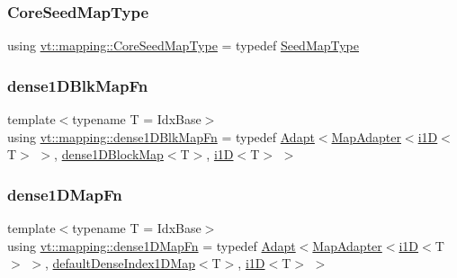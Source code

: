 \subsubsection{\texorpdfstring{Core\+Seed\+Map\+Type}{CoreSeedMapType}}
{\footnotesize\ttfamily using \hyperlink{namespacevt_1_1mapping_a963a37316992c8805e9a381a07380de0}{vt\+::mapping\+::\+Core\+Seed\+Map\+Type} = typedef \hyperlink{namespacevt_1_1mapping_a1c1409d9af8d1ac402af022a65be4a4d}{Seed\+Map\+Type}}

\mbox{\label{namespacevt_1_1mapping_aa1117076bb1d73ecb84905dc391c0528}} 
\subsubsection{\texorpdfstring{dense1\+D\+Blk\+Map\+Fn}{dense1DBlkMapFn}}
{\footnotesize\ttfamily template$<$typename T  = Idx\+Base$>$ \\
using \hyperlink{namespacevt_1_1mapping_aa1117076bb1d73ecb84905dc391c0528}{vt\+::mapping\+::dense1\+D\+Blk\+Map\+Fn} = typedef \hyperlink{namespacevt_1_1mapping_aafe187035ce8df02f31983e37cdb6a5d}{Adapt}$<$\hyperlink{namespacevt_1_1mapping_a41b113c28bb6430fbcb5be66e08ccf9f}{Map\+Adapter}$<$\hyperlink{namespacevt_1_1mapping_af0c14a9a77e0311b3d089143ed93ba76}{i1D}$<$T$>$ $>$, \hyperlink{namespacevt_1_1mapping_a2d49151f03d4ce393b01c620f6b18517}{dense1\+D\+Block\+Map}$<$T$>$, \hyperlink{namespacevt_1_1mapping_af0c14a9a77e0311b3d089143ed93ba76}{i1D}$<$T$>$ $>$}

\mbox{\label{namespacevt_1_1mapping_afe31b6db2c26ee24a6dd3cdf7b68415f}} 
\subsubsection{\texorpdfstring{dense1\+D\+Map\+Fn}{dense1DMapFn}}
{\footnotesize\ttfamily template$<$typename T  = Idx\+Base$>$ \\
using \hyperlink{namespacevt_1_1mapping_afe31b6db2c26ee24a6dd3cdf7b68415f}{vt\+::mapping\+::dense1\+D\+Map\+Fn} = typedef \hyperlink{namespacevt_1_1mapping_aafe187035ce8df02f31983e37cdb6a5d}{Adapt}$<$\hyperlink{namespacevt_1_1mapping_a41b113c28bb6430fbcb5be66e08ccf9f}{Map\+Adapter}$<$\hyperlink{namespacevt_1_1mapping_af0c14a9a77e0311b3d089143ed93ba76}{i1D}$<$T$>$ $>$, \hyperlink{namespacevt_1_1mapping_ae055a42b89a59fd6d0cc6d40f9abf3b5}{default\+Dense\+Index1\+D\+Map}$<$T$>$, \hyperlink{namespacevt_1_1mapping_af0c14a9a77e0311b3d089143ed93ba76}{i1D}$<$T$>$ $>$}

